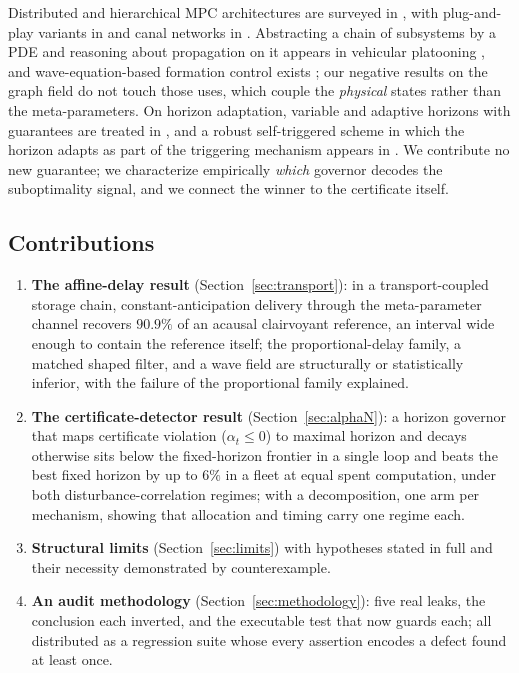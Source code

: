 \documentclass[journal]{IEEEtran}
\theoremstyle{definition}
\begin{document}
Distributed and hierarchical MPC architectures are surveyed in
\cite{scattolini2009,christofides2013}, with plug-and-play variants in
\cite{riverso2013} and canal networks in \cite{negenborn2009}. Abstracting a
chain of subsystems by a PDE and reasoning about propagation on it appears in
vehicular platooning \cite{barooah2009}, and wave-equation-based formation
control exists \cite{qi2018}; our negative results on the graph field do not
touch those uses, which couple the \emph{physical} states rather than the
meta-parameters. On horizon adaptation, variable and adaptive horizons with
guarantees are treated in \cite{gruene2010timevarying,krener2018adaptive}, and
a robust self-triggered scheme in which the horizon adapts as part of the
triggering mechanism appears in \cite{sun2019robust}. We contribute no new
guarantee; we characterize empirically \emph{which} governor decodes the
suboptimality signal, and we connect the winner to the certificate itself.

\subsection*{Contributions}
\begin{enumerate}
\item \textbf{The affine-delay result} (Section~\ref{sec:transport}): in a
transport-coupled storage chain, constant-anticipation delivery through the
meta-parameter channel recovers $90.9\%$ of an acausal clairvoyant
reference, an interval wide enough to contain the reference itself; the
proportional-delay family, a matched shaped filter, and a wave field are
structurally or statistically inferior, with the failure of the proportional
family explained.
\item \textbf{The certificate-detector result} (Section~\ref{sec:alphaN}): a
horizon governor that maps certificate violation ($\alpha_t\le0$) to maximal
horizon and decays otherwise sits below the fixed-horizon frontier in a single
loop and beats the best fixed horizon by up to $6\%$ in a fleet at equal
spent computation, under both disturbance-correlation regimes; with a
decomposition, one arm per mechanism, showing that allocation and timing carry
one regime each.
\item \textbf{Structural limits} (Section~\ref{sec:limits}) with hypotheses
stated in full and their necessity demonstrated by counterexample.
\item \textbf{An audit methodology} (Section~\ref{sec:methodology}): five real
leaks, the conclusion each inverted, and the executable test that now guards
each; all distributed as a regression suite whose every assertion encodes a
defect found at least once.
\end{enumerate}
\end{document}
